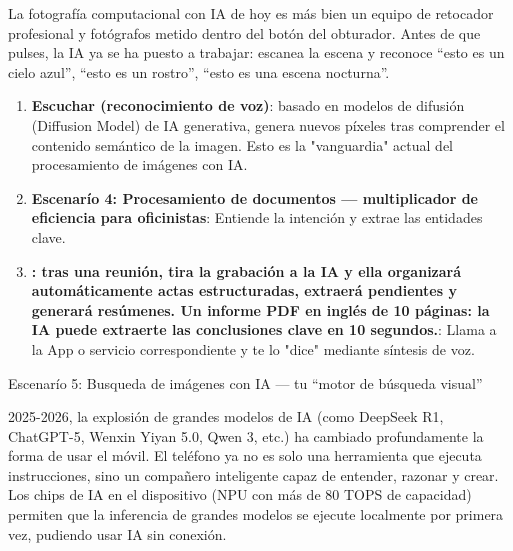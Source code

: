 


La fotografía computacional con IA de hoy es más bien un equipo de retocador profesional y fotógrafos metido dentro del botón del obturador. Antes de que pulses, la IA ya se ha puesto a trabajar: escanea la escena y reconoce “esto es un cielo azul”, “esto es un rostro”, “esto es una escena nocturna”.


\begin{enumerate}
  \item \textbf{Escuchar (reconocimiento de voz)}: basado en modelos de difusión (Diffusion Model) de IA generativa, genera nuevos píxeles tras comprender el contenido semántico de la imagen. Esto es la "vanguardia" actual del procesamiento de imágenes con IA.
  \item \textbf{Escenarío 4: Procesamiento de documentos — multiplicador de eficiencia para oficinistas}: Entiende la intención y extrae las entidades clave.
  \item \textbf{: tras una reunión, tira la grabación a la IA y ella organizará automáticamente actas estructuradas, extraerá pendientes y generará resúmenes. Un informe PDF en inglés de 10 páginas: la IA puede extraerte las conclusiones clave en 10 segundos.}: Llama a la App o servicio correspondiente y te lo "dice" mediante síntesis de voz.
\end{enumerate}


Escenarío 5: Busqueda de imágenes con IA — tu “motor de búsqueda visual”


2025-2026, la explosión de grandes modelos de IA (como DeepSeek R1, ChatGPT-5, Wenxin Yiyan 5.0, Qwen 3, etc.) ha cambiado profundamente la forma de usar el móvil. El teléfono ya no es solo una herramienta que ejecuta instrucciones, sino un compañero inteligente capaz de entender, razonar y crear. Los chips de IA en el dispositivo (NPU con más de 80 TOPS de capacidad) permiten que la inferencia de grandes modelos se ejecute localmente por primera vez, pudiendo usar IA sin conexión.


